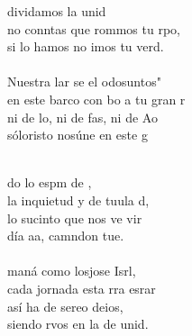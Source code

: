 \begin{cancion}
	dividamos la unid\\
	no conntas que rommos tu rpo,\\
	si lo hamos no imos tu verd.\\
\jump\\
	Nuestra lar se el odosuntos"\\
	en este barco con bo a tu gran r\\
	ni de lo, ni de fas, ni de Ao\\
	sóloristo nosúne en este g\\\jump\\
	\begin{chorus}%
	do lo espm de ,\\
	la inquietud y de tuula d,\\
	lo sucinto que nos ve vir\\
	día aa, camndon tue. \\
\jump\\
	 maná como losjose Isrl,\\
	cada jornada esta rra esrar\\
	así ha de sereo deios,\\
	siendo rvos en la de  unid.\\
	\end{chorus}%
	\jump\\
\end{cancion}%
